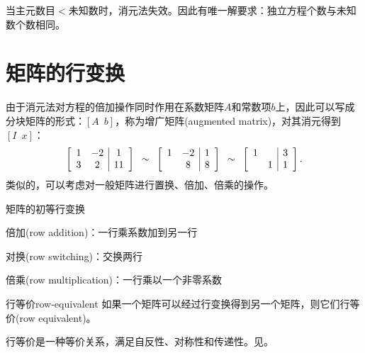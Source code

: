 \begin{remark}
	当主元数目$<$未知数时，消元法失效。因此有唯一解要求：独立方程个数与未知数个数相同。
\end{remark}

\section{矩阵的行变换}

由于消元法对方程的倍加操作同时作用在系数矩阵$A$和常数项$b$上，因此可以写成分块矩阵的形式：$[A\enspace b]$，称为增广矩阵(augmented matrix)，对其消元得到$[I\enspace x]$：
\[
	\left[\begin{array}{cc|c}
		1&-2&1\\3&2&11
	\end{array}\right]
	\enspace\sim\enspace
	\left[\begin{array}{cc|c}
		1&-2&1\\ &8&8
	\end{array}\right]
	\enspace\sim\enspace
	\left[\begin{array}{cc|c}
		1&&3\\ &1&1
	\end{array}\right].
\]
类似的，可以考虑对一般矩阵进行置换、倍加、倍乘的操作。
\begin{definition}{矩阵的初等行变换}{}
	\begin{compactitem}
		\item 倍加(row addition)：一行乘系数加到另一行
		\item 对换(row switching)：交换两行
		\item 倍乘(row multiplication)：一行乘以一个非零系数
	\end{compactitem}
\end{definition}

\begin{definition}{行等价}{row-equivalent}
	如果一个矩阵可以经过行变换得到另一个矩阵，则它们行等价(row equivalent)。
\end{definition}

\begin{remark}
	行等价是一种等价关系，满足自反性、对称性和传递性。见。
\end{remark}


